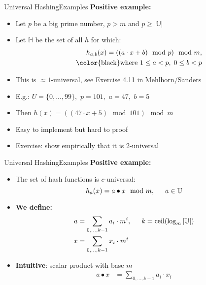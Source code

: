\begin{frame}{Universal Hashing}{Examples}
  \textbf{Positive example:}
  \begin{itemize}
    \item<1->
      Let {\color{MainA}$p$} be a big prime number, {\color{MainA}$p > m$}
      and {\color{MainA}$p \geq \vert \mathbb{U} \vert$}
    \item<2->
      Let {\color{MainA}$\mathbb{H}$} be the set of all {\color{MainA}$h$}
      for which:
      {\color{MainA}
      \begin{align*}
        h_{a, b}(x) = ((a \cdot x + b) \mod p) \mod m,\\
        \hspace*{1.5em} \text{{\color{black}where }}
        1 \leq a < p, \; 0 \leq b < p
      \end{align*}}
    \item<3->
      This is {\color{MainA}$\approx1$-universal},
      see {\color{teal}Exercise 4.11} in Mehlhorn/Sanders
    \item<4->
      E.g.: {\color{MainA}$U=\{0,...,99\},$ \hspace{0.5em} $p=101,$
        \hspace{0.5em} $a=47,$ $b=5$}
   \item<5->
     Then {\color{MainA}$h(x) = ((47 \cdot x + 5) \mod 101) \mod m$}
   \item<6->
     Easy to implement but hard to proof
   \item<7->
     Exercise: show empirically that it is {\color{MainA}$2$}-universal
  \end{itemize}
\end{frame}


\begin{frame}{Universal Hashing}{Examples}
  \textbf{Positive example:}
  \begin{itemize}
    \item<1->
      The set of hash functions is {\color{MainA}$c$}-universal:
      {\color{MainA}
      \[h_{a}(x) = a \bullet x \mod m, \hspace*{1.5em} a \in \mathbb{U}\]}
    \item<2->
      \textbf{We define:}
      {\color{MainA}
      \begin{align*}
        a &= \sum_{0, \ldots, k-1} a_i \cdot m^i,
        \hspace*{1.5em} k = \mathrm{ceil}(\log_m \vert \mathbb{U} \vert)\\
        x &= \sum_{0, \ldots, k-1} x_i \cdot m^i
      \end{align*}}
    \item<3->
      \textbf{Intuitive}: scalar product with base {\color{MainA}$m$}
      {\color{MainA}
      \begin{align*}
        a \bullet x &= \sum_{0, \ldots, k-1} a_i \cdot x_i
      \end{align*}}
  \end{itemize}
\end{frame}

